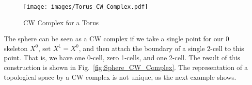 \documentclass{book}                                                           %
\begin{document}
            \begin{figure}[H]
                \centering
                \captionsetup{type=figure}
                \texttt{[image: images/Torus\_CW\_Complex.pdf]}
                \caption{CW Complex for a Torus}
                \label{fig:CW_Complex_Torus}
            \end{figure}
            \begin{minipage}[t]{0.52\textwidth}
                \begin{example}
                    The sphere can be seen as a CW complex if we take a single
                    point for our 0 skeleton $X^{0}$, set $X^{1}=X^{0}$, and
                    then attach the boundary of a single 2-cell to this point.
                    That is, we have one 0-cell, zero 1-cells, and one 2-cell.
                    The result of this construction is shown in
                    Fig.~\ref{fig:Sphere_CW_Complex}. The representation of a
                    topological space by a CW complex is not unique, as the
                    next example shows.
                \end{example}
            \end{minipage}
            \hfill
            \par\vspace{2.5ex}
\end{document}
